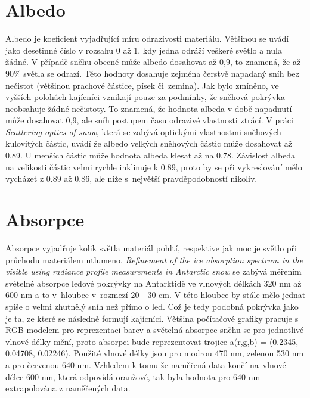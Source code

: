\section{Albedo}
Albedo je koeficient vyjadřující míru odrazivosti materiálu. Většinou se uvádí jako desetinné číslo v rozsahu 0 až 1, kdy jedna odráží veškeré světlo a nula žádné. V případě sněhu obecně může albedo dosahovat až 0,9, to znamená, že až 90\% světla se odrazí. Této hodnoty dosahuje zejména čerstvě napadaný sníh bez nečistot (většinou prachové částice, písek či~zemina). Jak bylo zmíněno, ve vyšších polohách kajícníci vznikají pouze za podmínky, že sněhová pokrývka neobsahuje žádné nečistoty. To znamená, že hodnota albeda v době napadnutí může dosahovat 0,9, ale sníh postupem času odrazivé vlastnosti ztrácí. V práci \textit{Scattering optics of snow}\cite{soos}, která se zabývá optickými vlastnostmi sněhových kulovitých částic, uvádí že albedo velkých sněhových částic může dosahovat až 0.89. U menších částic může hodnota albeda klesat až na 0.78. Závislost albeda na velikosti částic velmi rychle inklinuje k 0.89, proto by se při vykreslování mělo vycházet z 0.89 až 0.86, ale níže s~největší pravděpodobností nikoliv.
\section{Absorpce}
Absorpce vyjadřuje kolik světla materiál pohltí, respektive jak moc je světlo při průchodu materiálem utlumeno. \textit{Refinement of the ice absorption spectrum in the visible using radiance profile measurements in Antarctic snow}\cite{refinement_ice} se zabývá měřením světelné absorpce ledové pokrývky na Antarktidě ve vlnových délkách 320 nm až 600 nm a to v~hloubce v~rozmezí 20 - 30 cm. V této hloubce by stále mělo jednat spíše o velmi zhutnělý sníh než přímo o led. Což je tedy podobná pokrývka jako je ta, ze které se následně formují kajícníci. Většina počítačové grafiky pracuje s RGB modelem pro reprezentaci barev a světelná absorpce sněhu se pro jednotlivé vlnové délky mění, proto absorpci bude reprezentovat trojice a(r,g,b) = (0.2345, 0.04708, 0.02246). Použité vlnové délky jsou pro modrou 470 nm, zelenou 530 nm a pro červenou 640 nm. Vzhledem k tomu že naměřená data končí na~vlnové délce 600 nm, která odpovídá oranžové, tak byla hodnota pro 640 nm extrapolována z naměřených data. 
